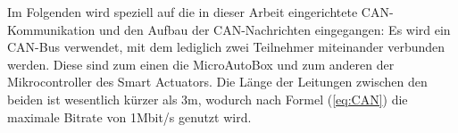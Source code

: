 Im Folgenden wird speziell auf die in dieser Arbeit eingerichtete CAN-Kommunikation und den Aufbau der CAN-Nachrichten eingegangen: Es wird ein CAN-Bus verwendet, mit dem lediglich zwei Teilnehmer miteinander verbunden werden. Diese sind zum einen die MicroAutoBox und zum anderen der Mikrocontroller des Smart Actuators. Die Länge der Leitungen zwischen den beiden ist wesentlich kürzer als 3m, wodurch nach Formel (\ref{eq:CAN}) die maximale Bitrate von 1Mbit/s genutzt wird.
